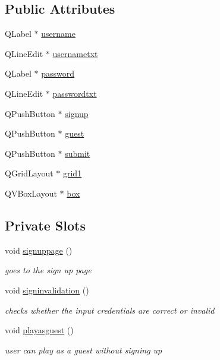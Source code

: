 \subsection*{Public Attributes}
\begin{DoxyCompactItemize}
\item 
Q\+Label $\ast$ \hyperlink{classSignin_ab608f7654e8d2cb405b1739151f1c83f}{username}
\item 
Q\+Line\+Edit $\ast$ \hyperlink{classSignin_a3c5f17e8afe4ab6b7a4d153329902e0f}{usernametxt}
\item 
Q\+Label $\ast$ \hyperlink{classSignin_abbf298a5c5735f84c15986e8bf91a356}{password}
\item 
Q\+Line\+Edit $\ast$ \hyperlink{classSignin_aec2542a3f3cc21892e2b8c7f472d9886}{passwordtxt}
\item 
Q\+Push\+Button $\ast$ \hyperlink{classSignin_a2d789cd4c64d00ef543eb1c9d259b411}{signup}
\item 
Q\+Push\+Button $\ast$ \hyperlink{classSignin_a5a2511c325ac5f9e9e43d48e4bfcafdf}{guest}
\item 
Q\+Push\+Button $\ast$ \hyperlink{classSignin_a33a74d30ed8189998f289e476d1eebbc}{submit}
\item 
Q\+Grid\+Layout $\ast$ \hyperlink{classSignin_ac2de4c6e9e652cf0954702b847dadf5a}{grid1}
\item 
Q\+V\+Box\+Layout $\ast$ \hyperlink{classSignin_abc6d05488b0d134965c7dafbc049ac3b}{box}
\end{DoxyCompactItemize}
\subsection*{Private Slots}
\begin{DoxyCompactItemize}
\item 
void \hyperlink{classSignin_af4276b4dc2cbbdba1f88746ad6d97dbd}{signuppage} ()
\begin{DoxyCompactList}\small\item\em goes to the sign up page \end{DoxyCompactList}\item 
void \hyperlink{classSignin_a0a6afd65a4526eec5cbc68e84ba35852}{signinvalidation} ()
\begin{DoxyCompactList}\small\item\em checks whether the input credentials are correct or invalid \end{DoxyCompactList}\item 
void \hyperlink{classSignin_afabfdc04cfc9589c8dabe9b649e41112}{playasguest} ()
\begin{DoxyCompactList}\small\item\em user can play as a guest without signing up \end{DoxyCompactList}\end{DoxyCompactItemize}



